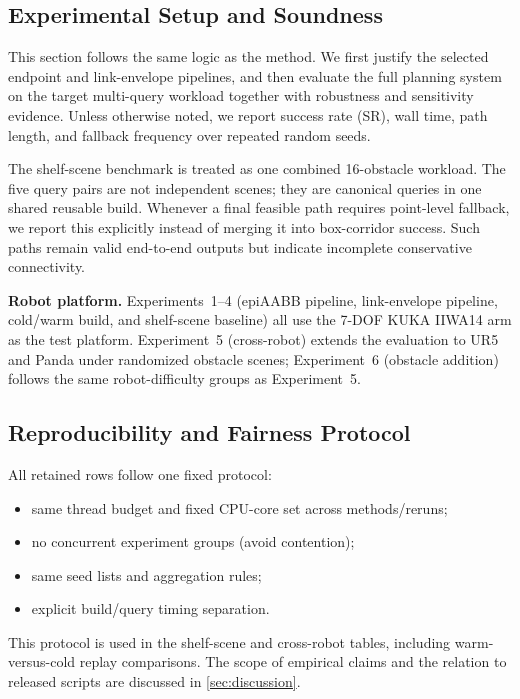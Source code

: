 \documentclass[journal]{IEEEtran}
\begin{document}
\subsection{Experimental Setup and Soundness}\label{sec:exp_setup_sound}

This section follows the same logic as the method. We first justify
the selected endpoint and link-envelope pipelines, and then evaluate the full
planning system on the target multi-query workload together with robustness and
sensitivity evidence. Unless otherwise noted, we report success rate (SR), wall
time, path length, and fallback frequency over repeated random seeds.

The shelf-scene benchmark is treated as one combined 16-obstacle workload.
The five query pairs are not independent scenes; they are canonical queries in
one shared reusable build.
Whenever a final feasible path requires point-level fallback, we report this
explicitly instead of merging it into box-corridor success. Such paths remain
valid end-to-end outputs but indicate incomplete conservative connectivity.

\textbf{Robot platform.}
Experiments~1--4 (epiAABB pipeline, link-envelope pipeline, cold/warm build,
and shelf-scene baseline) all use the 7-DOF KUKA IIWA14 arm as the test
platform. Experiment~5 (cross-robot) extends the evaluation to UR5 and Panda
under randomized obstacle scenes; Experiment~6 (obstacle addition) follows the
same robot-difficulty groups as Experiment~5.

\subsection{Reproducibility and Fairness Protocol}
\label{sec:exp_repro}

All retained rows follow one fixed protocol:
\begin{itemize}[nosep]
  \item same thread budget and fixed CPU-core set across methods/reruns;
  \item no concurrent experiment groups (avoid contention);
  \item same seed lists and aggregation rules;
  \item explicit build/query timing separation.
\end{itemize}
This protocol is used in the shelf-scene and cross-robot tables, including
warm-versus-cold replay comparisons. The scope of empirical claims and the
relation to released scripts are discussed in \cref{sec:discussion}.
\end{document}
